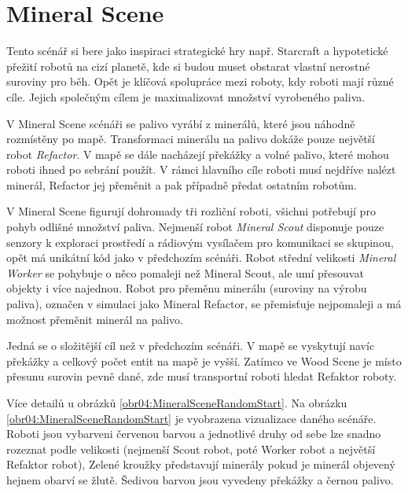 \section{Mineral Scene}
Tento scénář si bere jako inspiraci strategické hry např. Starcraft \citep*{starcraft} a hypotetické přežití robotů na cizí planetě, kde si budou muset obstarat vlastní nerostné suroviny pro běh. Opět je klíčová spolupráce mezi roboty, kdy roboti mají různé cíle. Jejich společným cílem je maximalizovat množství vyrobeného paliva.
\par 
V Mineral Scene scénáři se palivo vyrábí z minerálů, které jsou náhodně rozmístěny po mapě. Transformaci minerálu na palivo dokáže pouze největší robot \textit{Refactor}. V mapě se dále nacházejí překážky a volné palivo, které mohou roboti ihned po sebrání použít. V rámci hlavního cíle roboti musí nejdříve nalézt minerál, Refactor jej přeměnit a pak případně předat ostatním robotům. 
\par
V Mineral Scene figurují dohromady tři rozliční roboti, všichni potřebují pro pohyb odlišné množství paliva. Nejmenší robot \textit{Mineral Scout} disponuje pouze senzory k exploraci prostředí a rádiovým vysílačem pro komunikaci se skupinou, opět má unikátní kód  jako v předchozím scénáři. Robot střední velikosti \textit{Mineral Worker} se pohybuje o něco pomaleji než Mineral Scout, ale umí přesouvat objekty i více najednou. Robot pro přeměnu minerálu (suroviny na výrobu paliva), označen v simulaci jako Mineral Refactor, se přemisťuje nejpomaleji a má možnost přeměnit minerál na palivo. 
\par
Jedná se o složitější cíl než v předchozím scénáři. V mapě se vyskytují navíc překážky a celkový počet entit na mapě je vyšší. Zatímco ve Wood Scene je místo přesunu surovin pevně dané, zde musí transportní roboti hledat Refaktor roboty.
\par 
Více detailů u obrázků \ref{obr04:MineralSceneRandomStart}.
\newpage
Na obrázku \ref{obr04:MineralSceneRandomStart} je vyobrazena vizualizace daného scénáře. Roboti jsou vybarveni červenou barvou a jednotlivé druhy od sebe lze snadno rozeznat podle velikosti (nejmenší Scout robot, poté Worker robot a největší Refaktor robot), Zelené kroužky představují minerály pokud je minerál objevený hejnem obarví se žlutě. Šedivou barvou jsou vyvedeny překážky a černou palivo.

